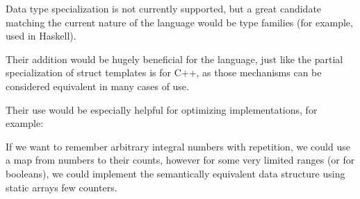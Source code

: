 Data type specialization is not currently supported, but a great candidate matching the current nature of the language would be type families (for example, used in Haskell).

Their addition would be hugely beneficial for the language, just like the partial specialization of struct templates is for C++, as those mechanisms can be considered equivalent in many cases of use.

Their use would be especially helpful for optimizing implementations, for example:

If we want to remember arbitrary integral numbers with repetition, we could use a map from numbers to their counts, however for some very limited ranges (or for booleans), we could implement the semantically equivalent data structure using static arrays few counters.
